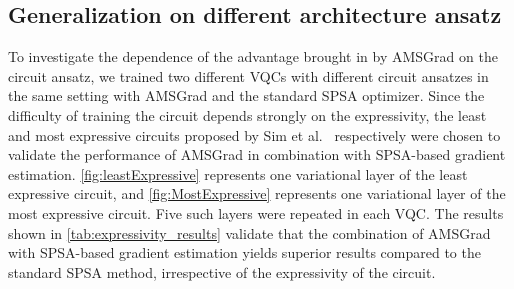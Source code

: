 \begin{figure*}[htbp!]
    \centering
    \caption{The variational layer of the least expressive VQC proposed by Sim et al.}
    \label{fig:MostExpressive}
\end{figure*}

\subsection{Generalization on different architecture ansatz}
To investigate the dependence of the advantage brought in by AMSGrad on the circuit ansatz, we trained two different VQCs with different circuit ansatzes in the same setting with AMSGrad and the standard SPSA optimizer. Since the difficulty of training the circuit depends strongly on the expressivity, the least and most expressive circuits proposed by Sim et al.~\cite{Sim2019, dragan2022quantum} respectively were chosen to validate the performance of AMSGrad in combination with SPSA-based gradient estimation. \cref{fig:leastExpressive} represents one variational layer of the least expressive circuit, and \cref{fig:MostExpressive} represents one variational layer of the most expressive circuit. Five such layers were repeated in each VQC. The results shown in \cref{tab:expressivity_results} validate that the combination of AMSGrad with SPSA-based gradient estimation yields superior results compared to the standard SPSA method, irrespective of the expressivity of the circuit.

